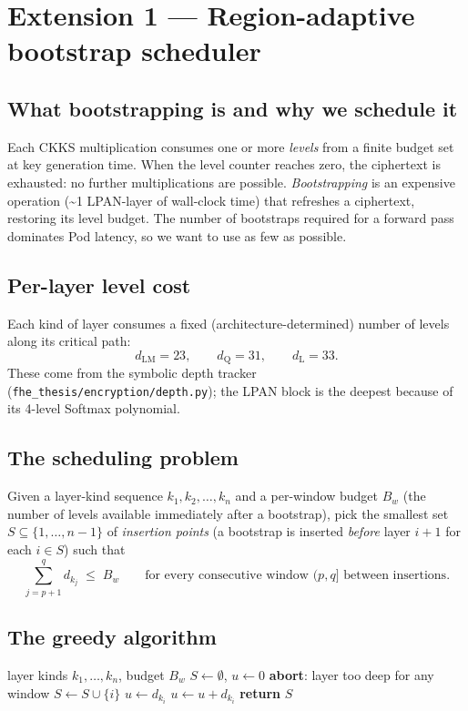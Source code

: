 \documentclass[11pt,a4paper]{article}
\begin{document}
\section{Extension 1 --- Region-adaptive bootstrap scheduler}
\label{sec:ext1}

\subsection{What bootstrapping is and why we schedule it}
Each CKKS multiplication consumes one or more \emph{levels} from a
finite budget set at key generation time. When the level counter
reaches zero, the ciphertext is exhausted: no further multiplications
are possible. \emph{Bootstrapping} is an expensive operation
(\textasciitilde{}1 LPAN-layer of wall-clock time) that refreshes a
ciphertext, restoring its level budget. The number of bootstraps
required for a forward pass dominates Pod latency, so we want to use
as few as possible.

\subsection{Per-layer level cost}
Each kind of layer consumes a fixed (architecture-determined) number of
levels along its critical path:
\[
d_{\text{LM}} = 23, \qquad d_{\text{Q}} = 31, \qquad d_{\text{L}} = 33.
\]
These come from the symbolic depth tracker
(\texttt{fhe\_thesis/encryption/depth.py}); the LPAN block is the
deepest because of its 4-level Softmax polynomial.

\subsection{The scheduling problem}
Given a layer-kind sequence $k_1, k_2, \dots, k_n$ and a per-window
budget $B_w$ (the number of levels available immediately after a
bootstrap), pick the smallest set $S \subseteq \{1, \dots, n-1\}$ of
\emph{insertion points} (a bootstrap is inserted \emph{before} layer
$i+1$ for each $i \in S$) such that
\[
\sum_{j=p+1}^{q} d_{k_j} \;\le\; B_w
\qquad \text{for every consecutive window } (p, q] \text{ between insertions.}
\]

\subsection{The greedy algorithm}
\begin{algorithm}[H]
\caption{\textsc{ScheduleBootstraps}}
\label{alg:bootstrap}
\begin{algorithmic}[1]
\Require layer kinds $k_1,\dots,k_n$, budget $B_w$
\State $S \gets \emptyset$, $u \gets 0$
        \State \textbf{abort}: layer too deep for any window
    \EndIf
        \State $S \gets S \cup \{i\}$ 
        \State $u \gets d_{k_i}$
    \Else
        \State $u \gets u + d_{k_i}$
    \EndIf
\EndFor
\State \textbf{return} $S$
\end{algorithmic}
\end{algorithm}
\end{document}
